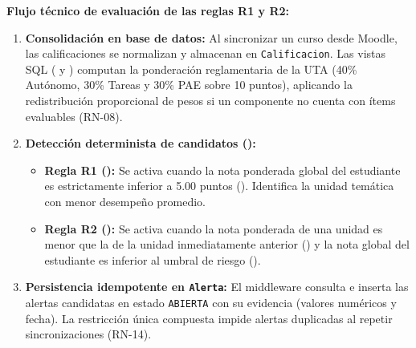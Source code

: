 \documentclass[11pt,a4paper]{article}
\begin{document}
\textbf{Flujo técnico de evaluación de las reglas R1 y R2:}
\begin{enumerate}
  \item \textbf{Consolidación en base de datos:} Al sincronizar un curso desde Moodle, las calificaciones se normalizan y almacenan en \texttt{Calificacion}. Las vistas SQL ( y ) computan la ponderación reglamentaria de la UTA (40\% Autónomo, 30\% Tareas y 30\% PAE sobre 10 puntos), aplicando la redistribución proporcional de pesos si un componente no cuenta con ítems evaluables (RN-08).
  \item \textbf{Detección determinista de candidatos ():}
  \begin{itemize}
    \item \textbf{Regla R1 ():} Se activa cuando la nota ponderada global del estudiante es estrictamente inferior a 5.00 puntos (). Identifica la unidad temática con menor desempeño promedio.
    \item \textbf{Regla R2 ():} Se activa cuando la nota ponderada de una unidad es menor que la de la unidad inmediatamente anterior () y la nota global del estudiante es inferior al umbral de riesgo ().
  \end{itemize}
  \item \textbf{Persistencia idempotente en \texttt{Alerta}:} El middleware consulta  e inserta las alertas candidatas en estado \texttt{ABIERTA} con su evidencia (valores numéricos y fecha). La restricción única compuesta  impide alertas duplicadas al repetir sincronizaciones (RN-14).
\end{enumerate}
\end{document}
